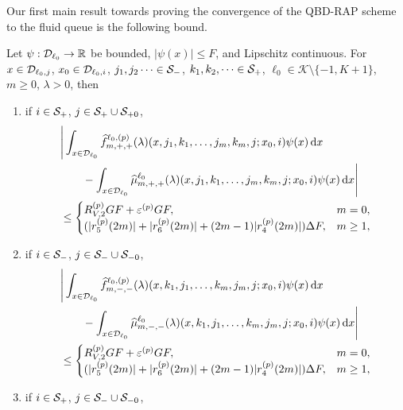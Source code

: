 Our first main result towards proving the convergence of the QBD-RAP scheme to the fluid queue is the following bound. 
\begin{cor}\label{cor: lst diff}Let \(\psi:\mathcal{D}_{\ell_0}\to\mathbb R\) be bounded, \(|\psi(x)|\leq F\), and Lipschitz continuous. For \(x\in\mathcal{D}_{\ell_0,j}\), \(x_0\in\mathcal{D}_{\ell_0,i}\), \(j_1,j_2\dots\in\mathcal{S}_-\), \(k_1,k_2,\dots\in\mathcal{S}_+\), \(\ell_0\in\mathcal K\setminus\{-1,K+1\}\), \(m\geq 0\), \(\lambda > 0\), then 
\begin{enumerate}
	\item if \(i\in\mathcal{S}_{+}\), \(j\in\mathcal{S}_+\cup\mathcal{S}_{+0}\),
	\begin{align}
                	&\Bigg|\int_{x\in\mathcal{D}_{\ell_0}}\widehat f^{\ell_0,(p)}_{m,+,+}(\lambda)(x,j_1,k_1,\dots,j_m,k_m,j; x_0,i)\psi(x) \, \mathrm{d} x \nonumber 
	\\&\qquad{} - \int_{x\in\mathcal{D}_{\ell_0}}\widehat \mu^{\ell_0}_{m,+,+}(\lambda)(x,j_1,k_1,\dots,j_m,k_m,j; x_0,i)\psi(x)\, \mathrm{d} x\Bigg| \nonumber
                	\\&\leq \begin{cases}
			R_{V,2}^{(p)} GF + \varepsilon^{(p)} GF, & m = 0, \\
			(|r_5^{(p)}(2m)| + |r_6^{(p)}(2m)| + (2m-1)|r_4^{(p)}(2m)|)\Delta F,  &  m\geq 1,
			\end{cases}\label{eqn: ++}
	\end{align}
	\item if \(i\in\mathcal{S}_{-}\), \(j\in\mathcal{S}_-\cup\mathcal{S}_{-0}\),
	\begin{align}
                	&\Bigg|\int_{x\in\mathcal{D}_{\ell_0}}\widehat f^{\ell_0,(p)}_{m,-,-}(\lambda)(x,k_1,j_1,\dots,k_m,j_m,j; x_0,i)\psi(x)\, \mathrm{d} x \nonumber
	\\&\qquad{} - \int_{x\in\mathcal{D}_{\ell_0}} \widehat \mu^{\ell_0}_{m,-,-}(\lambda)(x,k_1,j_1,\dots,k_m,j_m,j; x_0,i)\psi(x)\, \mathrm{d} x\Bigg| \nonumber
                	\\&\leq \begin{cases}
			R_{V,2}^{(p)} GF + \varepsilon^{(p)} GF, & m = 0, \\
			(|r_5^{(p)}(2m)| + |r_6^{(p)}(2m)| + (2m-1)|r_4^{(p)}(2m)|)\Delta F,  &  m\geq 1,
			\end{cases}\label{eqn: --}
	\end{align}
	\item if \(i\in\mathcal{S}_{+}\), \(j\in\mathcal{S}_-\cup\mathcal{S}_{-0}\),
	\begin{align}

\end{align}
\end{enumerate}
\end{cor}
